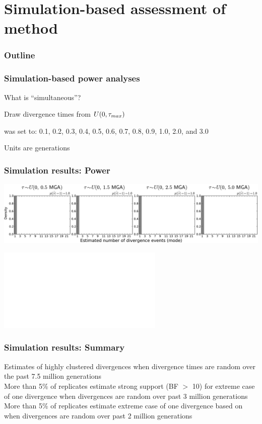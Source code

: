\section{Simulation-based assessment of method}

\begin{frame}
\frametitle{Outline}
\end{frame}

\begin{frame}
    \frametitle{Simulation-based power analyses}
    What is ``simultaneous''?
    \begin{myitemize}
        \item Draw divergence times from $U(0, \tau_{max})$
        \item {} was set to:
            0.1, 0.2, 0.3, 0.4, 0.5, 0.6, 0.7, 0.8, 0.9, 1.0, 2.0, and 3.0
        \item Units are \globalcoalunit generations
    \end{myitemize}
\end{frame}

\begin{frame}[t]
    \frametitle{Simulation results: Power}
    \vspace{1cm}
        \centerline{
        \includegraphics[width=\textwidth]{images/old-sims_power_psi_mode.pdf}}
        \vspace{0mm}
        \centerline{
        \includegraphics<2>[width=\textwidth]{images/old-sims_power_psi_prob_headless.pdf}}
\end{frame}

\begin{frame}
    \frametitle{Simulation results: Summary}
    Estimates of highly clustered divergences when divergence times are random
    over the past 7.5 million generations \\
    \bigskip
    More than 5\% of replicates estimate strong support (BF $>$ 10) for
    extreme case of one divergence when divergences are random over past 3
    million generations \\
    \bigskip
    More than 5\% of replicates estimate extreme case of one divergence based
    on \vmratio{} when divergences are random over past 2 million generations
\end{frame}

